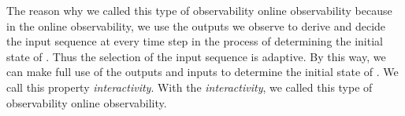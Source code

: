 The reason why we called this type of observability online observability because in the online observability, we use the outputs we observe to derive and decide the input sequence at every time step in the process of determining the initial state of \BCNs. Thus the selection of the input sequence is adaptive. By this way, we can make full use of the outputs and inputs to determine the initial state of \BCNs. We call this property {\em interactivity}. With the {\em interactivity}, we called this type of observability online observability.




